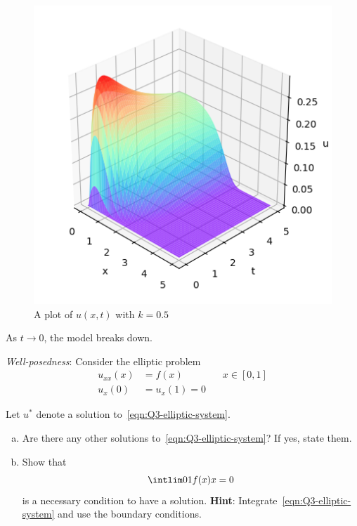 \documentclass[a4paper]{article}
\begin{document}
\begin{figure}[h]
    \centering
    \includegraphics[scale=0.8]{Q2}
    \caption{A plot of $u(x, t)$ with $k=0.5$}
\end{figure}

As $t \to 0$, the model breaks down.



\begin{questionbody}
\textit{Well-posedness}: Consider the elliptic problem \begin{align*}
u_{xx}(x) &= f(x) \qquad\qquad x \in [0, 1] \tag{\dagger}\label{eqn:Q3-elliptic-system} \\
u_x(0) &= u_x(1) = 0
\end{align*}

Let $u^*$ denote a solution to~\eqref{eqn:Q3-elliptic-system}.
\begin{enumerate}[(a)]
\item Are there any other solutions to~\eqref{eqn:Q3-elliptic-system}? If yes, state them.
\item Show that \[ \intlim 0 1 {f(x)} x = 0 \] is a necessary condition to have a solution. \textbf{Hint}: Integrate~\eqref{eqn:Q3-elliptic-system} and use the boundary conditions.
\end{enumerate}
\end{questionbody}

\subsection{~} %
\end{document}

